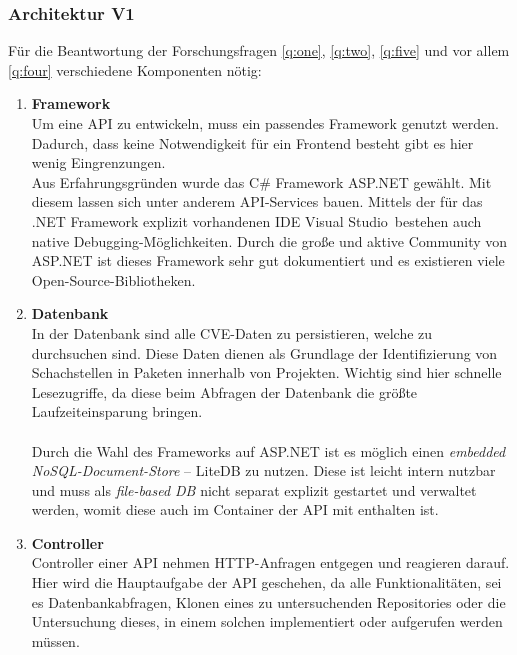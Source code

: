 \subsubsection{Architektur V1} \label{sec:Architektur}
    Für die Beantwortung der Forschungsfragen \ref{q:one}, \ref{q:two}, \ref{q:five} und vor allem \ref{q:four} verschiedene Komponenten nötig:
    \begin{enumerate}
        \item \textbf{Framework} \label{arch_1}\\
            Um eine API zu entwickeln, muss ein passendes Framework genutzt werden.
            Dadurch, dass keine Notwendigkeit für ein Frontend besteht gibt es hier wenig Eingrenzungen.
            \\
            Aus Erfahrungsgründen wurde das C\# Framework ASP.NET gewählt.
            Mit diesem lassen sich unter anderem API-Services bauen.
            Mittels der für das .NET Framework explizit vorhandenen IDE \glqq Visual Studio\grqq~bestehen auch native Debugging-Möglichkeiten.
            Durch die große und aktive Community von ASP.NET ist dieses Framework sehr gut dokumentiert und es existieren viele Open-Source-Bibliotheken.
        \item \textbf{Datenbank} \label{arch_2}\\
            In der Datenbank sind alle CVE-Daten zu persistieren, welche zu durchsuchen sind.
            Diese Daten dienen als Grundlage der Identifizierung von Schachstellen in Paketen innerhalb von Projekten.
            Wichtig sind hier schnelle Lesezugriffe, da diese beim Abfragen der Datenbank die größte Laufzeiteinsparung bringen.
            \\ \\
            Durch die Wahl des Frameworks auf ASP.NET ist es möglich einen \textit{embedded NoSQL-Document-Store} -- LiteDB zu nutzen. %
            Diese ist leicht intern nutzbar und muss als \textit{file-based DB} nicht separat explizit gestartet und verwaltet werden, womit diese auch im Container der API mit enthalten ist.
        \item \textbf{Controller} \label{arch_3}\\
            Controller einer API nehmen HTTP-Anfragen entgegen und reagieren darauf.
            Hier wird die Hauptaufgabe der API geschehen, da alle Funktionalitäten, sei es Datenbankabfragen, Klonen eines zu untersuchenden Repositories oder die Untersuchung dieses, in einem solchen implementiert oder aufgerufen werden müssen.

\end{enumerate}
